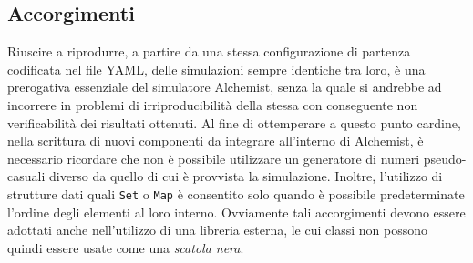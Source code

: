 \subsection{Accorgimenti}
Riuscire a riprodurre, a partire da una stessa configurazione di partenza codificata nel file YAML, delle simulazioni sempre identiche tra loro, è una prerogativa essenziale del simulatore Alchemist, senza la quale si andrebbe ad incorrere in problemi di irriproducibilità della stessa con conseguente non verificabilità dei risultati ottenuti. \newline
Al fine di ottemperare a questo punto cardine, nella scrittura di nuovi componenti da integrare all'interno di Alchemist, è necessario ricordare che non è possibile utilizzare un generatore di numeri pseudo-casuali diverso da quello di cui è provvista la simulazione. Inoltre, l'utilizzo di strutture dati quali \texttt{Set} o \texttt{Map} è consentito solo quando è possibile predeterminate l'ordine degli elementi al loro interno. \newline 
Ovviamente tali accorgimenti devono essere adottati anche nell'utilizzo di una libreria esterna, le cui classi non possono quindi essere usate come una \textit{scatola nera}.